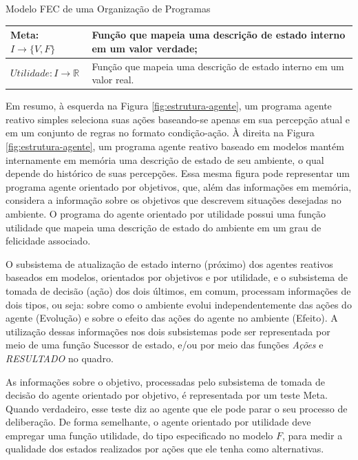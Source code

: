 \begin{section}{Modelo FEC de uma Organização de Programas}
\begin{table}[h!]
{\begin{tabular}{| p{4cm} | p{10cm}|}
                Meta:$I \rightarrow \{V,F\}$ & Função que mapeia uma descrição de estado interno em um valor verdade;  \\ \hline
                 
                $Utilidade: I \rightarrow \mathbb{R}$ & Função que mapeia uma descrição de estado interno em um valor real. \\ 
                \hline
                \end{tabular}
            }{
        }
        \end{table}
        
        Em resumo, à esquerda na Figura \ref{fig:estrutura-agente}, um programa agente reativo simples seleciona suas ações baseando-se apenas em sua percepção atual e em um conjunto de regras no formato condição-ação. À direita na Figura \ref{fig:estrutura-agente}, um programa agente reativo baseado em modelos mantém internamente em memória uma descrição de estado de seu ambiente, o qual depende do histórico de suas percepções. Essa mesma figura pode representar um programa agente orientado por objetivos, que, além das informações em memória, considera a informação sobre os objetivos que descrevem situações desejadas no ambiente. O programa do agente orientado por utilidade possui uma função utilidade que mapeia uma descrição de estado do ambiente em um grau de felicidade associado. 
    
        O subsistema de atualização de estado interno (próximo) dos agentes reativos baseados em modelos, orientados por objetivos e por utilidade, e o subsistema de tomada de decisão (ação) dos dois últimos, em comum, processam informações de dois tipos, ou seja: sobre como o ambiente evolui independentemente das ações do agente (Evolução) e sobre o efeito das ações do agente no ambiente (Efeito). A utilização dessas informações nos dois subsistemas pode ser representada por meio de uma função Sucessor de estado, e/ou por meio das funções \emph{Ações} e \emph{RESULTADO} no quadro.
        
        As informações sobre o objetivo, processadas pelo subsistema de tomada de decisão do agente orientado por objetivo, é representada por um teste Meta. Quando verdadeiro, esse teste diz ao agente que ele pode parar o seu processo de deliberação. De forma semelhante, o agente orientado por utilidade deve empregar uma função utilidade, do tipo especificado no modelo $F$, para medir a qualidade dos estados realizados por ações que ele tenha como alternativas.
        

\end{section}
